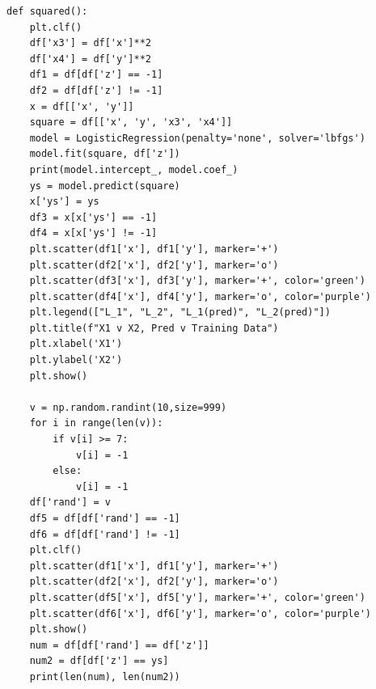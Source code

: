 \documentclass[10pt,a4paper]{article}
\begin{document}
\begin{verbatim}
def squared():
    plt.clf()
    df['x3'] = df['x']**2
    df['x4'] = df['y']**2
    df1 = df[df['z'] == -1]
    df2 = df[df['z'] != -1]
    x = df[['x', 'y']]
    square = df[['x', 'y', 'x3', 'x4']]
    model = LogisticRegression(penalty='none', solver='lbfgs')
    model.fit(square, df['z'])
    print(model.intercept_, model.coef_)
    ys = model.predict(square)
    x['ys'] = ys
    df3 = x[x['ys'] == -1]
    df4 = x[x['ys'] != -1]
    plt.scatter(df1['x'], df1['y'], marker='+')
    plt.scatter(df2['x'], df2['y'], marker='o')
    plt.scatter(df3['x'], df3['y'], marker='+', color='green')
    plt.scatter(df4['x'], df4['y'], marker='o', color='purple')
    plt.legend(["L_1", "L_2", "L_1(pred)", "L_2(pred)"])
    plt.title(f"X1 v X2, Pred v Training Data")
    plt.xlabel('X1')
    plt.ylabel('X2')
    plt.show()

    v = np.random.randint(10,size=999)
    for i in range(len(v)):
        if v[i] >= 7:
            v[i] = -1
        else:
            v[i] = -1
    df['rand'] = v
    df5 = df[df['rand'] == -1]
    df6 = df[df['rand'] != -1]
    plt.clf()
    plt.scatter(df1['x'], df1['y'], marker='+')
    plt.scatter(df2['x'], df2['y'], marker='o')
    plt.scatter(df5['x'], df5['y'], marker='+', color='green')
    plt.scatter(df6['x'], df6['y'], marker='o', color='purple')
    plt.show()
    num = df[df['rand'] == df['z']]
    num2 = df[df['z'] == ys]
    print(len(num), len(num2))

\end{verbatim}
\end{document}
